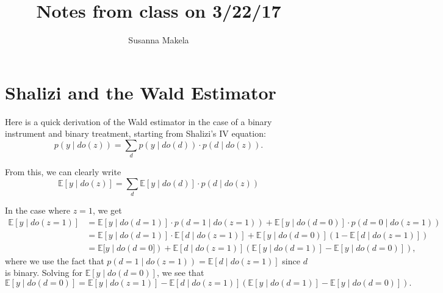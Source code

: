 \documentclass[10pt,a4paper]{article}
\author{Susanna Makela}
\title{Notes from class on 3/22/17}
\date{}
\begin{document}
\maketitle

\section*{Shalizi and the Wald Estimator}
Here is a quick derivation of the Wald estimator in the case of a binary instrument and binary treatment, starting from Shalizi's IV equation:
\begin{equation}\label{eq:shalizi}
	p(y \mid do(z)) = \sum_d p(y \mid do(d)) \cdot p(d \mid do(z)).
\end{equation}

From this, we can clearly write
\[
	\mathbb{E}[y \mid do(z)] = \sum_d \mathbb{E}[y \mid do(d)] \cdot p(d \mid do(z))
\]


In the case where $z=1$, we get
\begin{align*}
	\mathbb{E}[y \mid do(z = 1)] &= \mathbb{E}[y \mid do(d = 1)] \cdot p(d = 1 \mid do(z = 1)) + \mathbb{E}[y \mid do(d = 0)] \cdot p(d = 0 \mid do(z = 1)) \\
	&= \mathbb{E}[y \mid do(d = 1)] \cdot \mathbb{E}[d \mid do(z = 1)] + \mathbb{E}[y \mid do(d = 0)] \left( 1 - \mathbb{E}[d \mid do(z = 1)] \right) \\
	&= \mathbb{E}[y \mid do(d = 0]) + \mathbb{E}[d \mid do(z = 1)] \left( \mathbb{E}[y \mid do(d = 1)] - \mathbb{E}[y \mid do(d = 0)] \right),
\end{align*}
where we use the fact that $p(d = 1 \mid do(z = 1)) = \mathbb{E}[d \mid do(z = 1)]$ since $d$ is binary. Solving for $\mathbb{E}[y \mid do(d = 0)]$, we see that
\begin{equation}\label{eq:pt1}
	\mathbb{E}[y \mid do(d = 0)] = \mathbb{E}[y \mid do(z = 1)] - \mathbb{E}[d \mid do(z = 1)] \left( \mathbb{E}[y \mid do(d = 1)] - \mathbb{E}[y \mid do(d = 0)] \right).
\end{equation}
\end{document}
